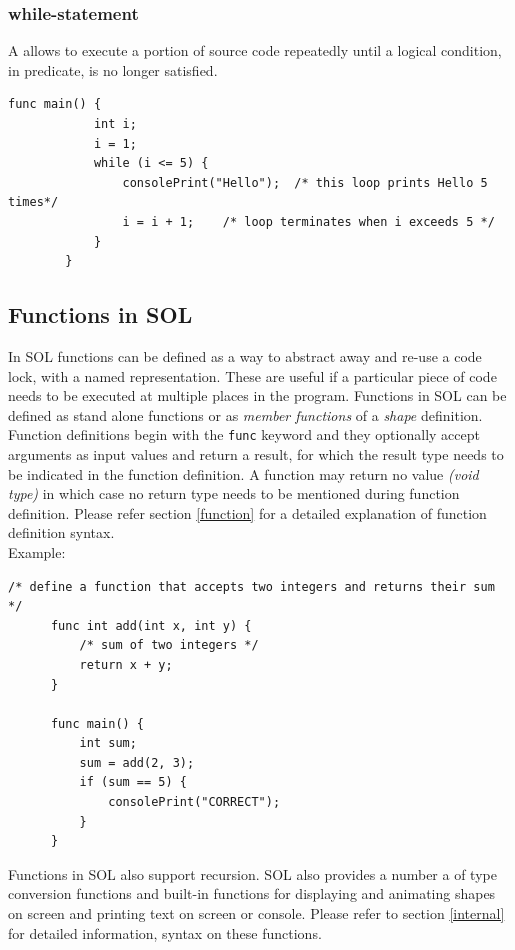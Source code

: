 \documentclass[letterpaper,12pt]{report}
\begin{document}
      \subsubsection{while-statement}
      A  allows to execute a portion of source code repeatedly until a logical condition, in predicate, is no longer satisfied.
      \begin{lstlisting}[style=sol]
        func main() {
            int i;
            i = 1;
            while (i <= 5) {
                consolePrint("Hello");  /* this loop prints Hello 5 times*/
                i = i + 1;    /* loop terminates when i exceeds 5 */
            }
        }
      \end{lstlisting}

    \subsection{Functions in SOL}
    In SOL functions can be defined as a way to abstract away and re-use a code lock, with a named representation. These are useful if a particular piece of code needs to be executed at multiple places in the program. Functions in SOL can be defined as stand alone functions or as \textit{member functions} of a \textit{shape} definition. Function definitions begin with the \texttt{func} keyword and they optionally accept arguments as input values and return a result, for which the result type needs to be indicated in the function definition. A function may return no value \textit{(void type)} in which case no return type needs to be mentioned during function definition. Please refer section \ref{function} for a detailed explanation of function definition syntax.\\
    
    Example:\\
    \begin{lstlisting}[style=sol]
      /* define a function that accepts two integers and returns their sum */
      func int add(int x, int y) {
          /* sum of two integers */
          return x + y;
      }

      func main() {
          int sum;
          sum = add(2, 3);
          if (sum == 5) {
              consolePrint("CORRECT");
          }
      }
    \end{lstlisting}

    Functions in SOL also support recursion. SOL also provides a number a of type conversion functions and built-in functions for displaying and animating shapes on screen and printing text on screen or console. Please refer to section \ref{internal} for detailed information, syntax on these functions.
\end{document}
